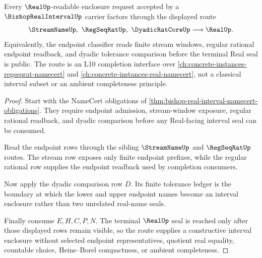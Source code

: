 \begin{theorem}
\label{thm:bishop-real-interval-regular-seal-route}
Every $\RealUp$-readable enclosure request accepted by a $\BishopRealIntervalUp$ carrier factors through the displayed route
$$
\StreamNameUp,\ \RegSeqRatUp,\ \DyadicRatCoreUp \longrightarrow \RealUp .
$$
Equivalently, the endpoint classifier reads finite stream windows, regular rational endpoint readback, and dyadic tolerance comparison before the terminal Real seal is public. The route is an L10 completion interface over \autoref{ch:concrete-instances-regseqrat-namecert} and \autoref{ch:concrete-instances-real-namecert}, not a classical interval subset or an ambient completeness principle.
\end{theorem}
\begin{proof}
Start with the NameCert obligations of \autoref{thm:bishop-real-interval-namecert-obligations}. They require endpoint admission, stream-window exposure, regular rational readback, and dyadic comparison before any Real-facing interval seal can be consumed.

Read the endpoint rows through the sibling $\StreamNameUp$ and $\RegSeqRatUp$ routes. The stream row exposes only finite endpoint prefixes, while the regular rational row supplies the endpoint readback used by completion consumers.

Now apply the dyadic comparison row $D$. Its finite tolerance ledger is the boundary at which the lower and upper endpoint names become an interval enclosure rather than two unrelated real-name seals.

Finally consume $E,H,C,P,N$. The terminal $\RealUp$ seal is reached only after those displayed rows remain visible, so the route supplies a constructive interval enclosure without selected endpoint representatives, quotient real equality, countable choice, Heine--Borel compactness, or ambient completeness.
\end{proof}


